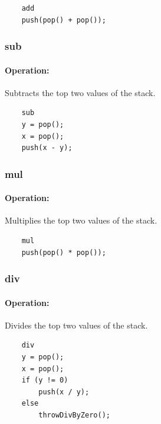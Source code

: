 	\begin{lstlisting}
	add
	push(pop() + pop());
	\end{lstlisting}

\subsubsection{sub}

\paragraph{Operation:}
Subtracts the top two values of the stack.

	\begin{lstlisting}
	sub
	y = pop();
	x = pop();
	push(x - y);
	\end{lstlisting}

\subsubsection{mul}

\paragraph{Operation:}
Multiplies the top two values of the stack.

	\begin{lstlisting}
	mul
	push(pop() * pop());
	\end{lstlisting}

\subsubsection{div}

\paragraph{Operation:}
Divides the top two values of the stack.

	\begin{lstlisting}
	div
	y = pop();
	x = pop();
	if (y != 0)
		push(x / y);
	else
		throwDivByZero();
	\end{lstlisting}


